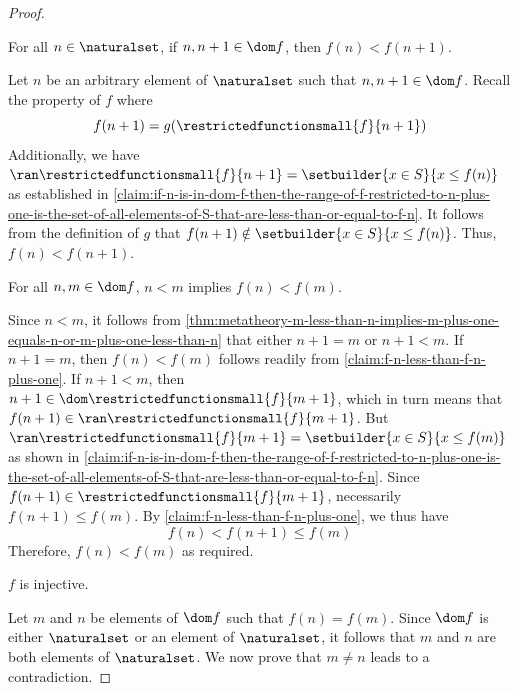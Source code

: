 \begin{proof}
    \begin{claim}
         \label{claim:f-n-less-than-f-n-plus-one}
        For all \( n \in \naturalset \), if \( n, n + 1 \in \dom f \), then \( f(n) < f(n + 1) \).
    \end{claim}
    \noindent
    Let \( n \) be an arbitrary element of \( \naturalset \) such that \( n, n + 1 \in \dom f \).
    Recall the property of \( f \) where
    \begin{equation*}
        f(n + 1) = g( \restrictedfunctionsmall{f}{n + 1} )
    \end{equation*}
    Additionally, we have \( \ran \restrictedfunctionsmall{f}{n + 1} = \setbuilder{x \in S}{x \leq f(n)} \)
    as established in \cref{claim:if-n-is-in-dom-f-then-the-range-of-f-restricted-to-n-plus-one-is-the-set-of-all-elements-of-S-that-are-less-than-or-equal-to-f-n}.
    It follows from the definition of \( g \) that \( f(n + 1) \notin \setbuilder{x \in S}{x \leq f(n)} \).
    Thus, \( f(n) < f(n + 1) \).

    \begin{claim}
         \label{claim:if-n-less-than-m-then-f-n-less-than-f-m}
        For all \( n, m \in \dom f \), \( n < m \) implies \( f(n) < f(m) \).
    \end{claim}
    \noindent
    Since \( n < m \), it follows from \cref{thm:metatheory-m-less-than-n-implies-m-plus-one-equals-n-or-m-plus-one-less-than-n} that either
    \( n + 1 = m \) or \( n + 1 < m \). If \( n + 1 = m \), then \( f(n) < f(m) \) follows readily from \cref{claim:f-n-less-than-f-n-plus-one}.
    If \( n + 1 < m \), then \( n + 1 \in \dom \restrictedfunctionsmall{f}{m + 1} \),
    which in turn means that \( f(n + 1) \in \ran \restrictedfunctionsmall{f}{m + 1} \).
    But \( \ran \restrictedfunctionsmall{f}{m + 1} = \setbuilder{x \in S}{x \leq f(m)} \) as shown in
    \cref{claim:if-n-is-in-dom-f-then-the-range-of-f-restricted-to-n-plus-one-is-the-set-of-all-elements-of-S-that-are-less-than-or-equal-to-f-n}.
    Since \( f(n + 1) \in \restrictedfunctionsmall{f}{m + 1} \), necessarily \( f(n + 1) \leq f(m) \).
    By \cref{claim:f-n-less-than-f-n-plus-one}, we thus have
    \begin{equation*}
        f(n) < f(n + 1) \leq f(m)
    \end{equation*}
    Therefore, \( f(n) < f(m) \) as required.
    
    \begin{claim}
         \label{claim:f-is-injective}
        \( f \) is injective.
    \end{claim}
    \noindent
    Let \( m \) and \( n \) be elements of \( \dom f \) such that \( f(n) = f(m) \).
    Since \( \dom f \) is either \( \naturalset \) or an element of \( \naturalset \), it follows that \( m \) and \( n \) are both elements of \( \naturalset \).
    We now prove that \( m \neq n \) leads to a contradiction.


\end{proof}
